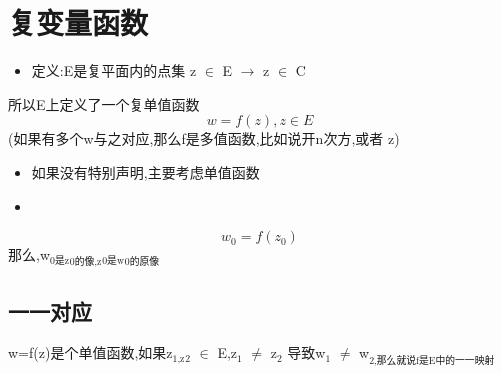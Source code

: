\documentclass[11pt]{article}
\begin{document}
\section{复变量函数}
\label{sec:orgfc3bd50}
\begin{itemize}
\item 定义:E是复平面内的点集 z \(\in\) E \(\rightarrow\) z \(\in\) C
\end{itemize}
所以E上定义了一个复单值函数
\[
w=f(z),z \in E
\]
(如果有多个w与之对应,那么f是多值函数,比如说开n次方,或者
\Arg z)
\begin{itemize}
\item 如果没有特别声明,主要考虑单值函数
\item 
\end{itemize}
\[
w_0= f(z_0)
\]
那么,w\(_{\text{0是z}}\)\(_{\text{0的像,z}}\)\(_{\text{0是w}}\)\(_{\text{0的原像}}\)
\subsection{一一对应}
\label{sec:orgd5423e4}
w=f(z)是个单值函数,如果z\(_{\text{1,z}}\)\(_{\text{2}}\) \(\in\) E,z\(_{\text{1}}\) \(\neq\) z\(_{\text{2}}\)
导致w\(_{\text{1}}\) \(\neq\) w\(_{\text{2,那么就说f是E中的一一映射}}\)
\end{document}
